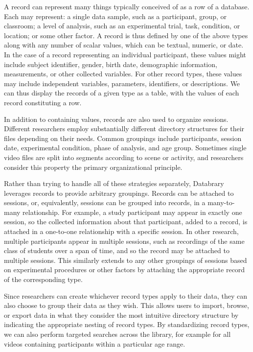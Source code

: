 \documentclass{sig-alternate}
\begin{document}
A record can represent many things typically conceived of as a row of a database.
Each may represent: a single data sample, such as a participant, group, or classroom; a level of analysis, such as an experimental trial, task, condition, or location; or some other factor. 
A record is thus defined by one of the above types along with any number of scalar values, which can be textual, numeric, or date.
In the case of a record representing an individual participant, these values might include subject identifier, gender, birth date, demographic information, measurements, or other collected variables.
For other record types, these values may include independent variables, parameters, identifiers, or descriptions. 
We can thus display the records of a given type as a table, with the values of each record constituting a row.

In addition to containing values, records are also used to organize sessions.
Different researchers employ substantially different directory structures for their files depending on their needs.
Common groupings include participants, session date, experimental condition, phase of analysis, and age group.
Sometimes single video files are split into segments according to scene or activity, and researchers consider this property the primary organizational principle.

Rather than trying to handle all of these strategies separately, Databrary leverages records to provide arbitrary groupings.
Records can be attached to sessions, or, equivalently, sessions can be grouped into records, in a many-to-many relationship.
For example, a study participant may appear in exactly one session, so the collected information about that participant, added to a record, is attached in a one-to-one relationship with a specific session.
In other research, multiple participants appear in multiple sessions, such as recordings of the same class of students over a span of time, and so the record may be attached to multiple sessions.
This similarly extends to any other groupings of sessions based on experimental procedures or other factors by attaching the appropriate record of the corresponding type.

Since researchers can create whichever record types apply to their data, they can also choose to group their data as they wish.
This allows users to import, browse, or export data in what they consider the most intuitive directory structure by indicating the appropriate nesting of record types.
By standardizing record types, we can also perform targeted searches across the library, for example for all videos containing participants within a particular age range.
\end{document}
